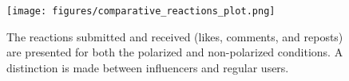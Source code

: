 \begin{figure}[h]
    \centering
    \texttt{[image: figures/comparative\_reactions\_plot.png]}
    \caption{The reactions submitted and received (likes, comments, and reposts) are presented for both the polarized and non-polarized conditions. A distinction is made between influencers and regular users.}
    \label{fig:influencer-regular-reactions}
\end{figure}
